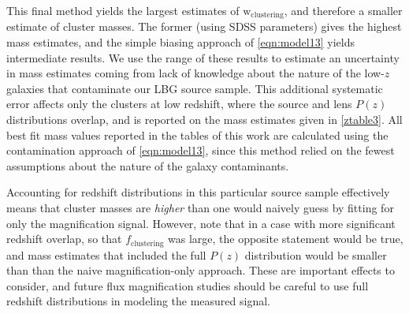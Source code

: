 This final method yields the largest estimates of $\mathrm{w}_{\mathrm{clustering}}$, and therefore a smaller estimate of cluster masses. The former (using \ac{SDSS} parameters) gives the highest mass estimates, and the simple biasing approach of \autoref{eqn:model13} yields intermediate results. We use the range of these results to estimate an uncertainty in mass estimates coming from lack of knowledge about the nature of the low-$z$ galaxies that contaminate our \ac{LBG} source sample. This additional systematic error affects only the clusters at low redshift, where the source and lens $P(z)$ distributions overlap, and is reported on the mass estimates given in \autoref{ztable3}. All best fit mass values reported in the tables of this work are calculated using the contamination approach of \autoref{eqn:model13}, since this method relied on the fewest assumptions about the nature of the galaxy contaminants.


Accounting for redshift distributions in this particular source sample effectively means that cluster masses are {\it higher} than one would naively guess by fitting for only the magnification signal. However, note that in a case with more significant redshift overlap, so that $f_{\mathrm{clustering}}$ was large, the opposite statement would be true, and mass estimates that included the full $P(z)$ distribution would be smaller than than the naive magnification-only approach. These are important effects to consider, and future flux magnification studies should be careful to use full redshift distributions in modeling the measured signal.



